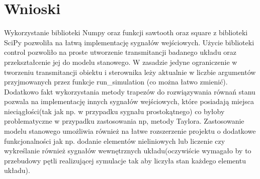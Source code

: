 \documentclass[12pt,a4paper]{article}
\begin{document}
\section{Wnioski}
Wykorzystanie biblioteki Numpy oraz funkcji sawtooth oraz square z biblioteki SciPy pozwoliła na łatwą implementację sygnałów wejściowych.
Użycie biblioteki control pozwoliło na proste utworzenie transmitancji badanego układu oraz przekształcenie jej do modelu stanowego. W zasadzie jedyne ograniczenie w tworzeniu transmitancji obiektu i sterownika leży aktualnie w liczbie argumentów przyjmowanych przez funkcje run\_simulation (co można łatwo zmienić).
Dodatkowo fakt wykorzystania metody trapezów do rozwiązywania równań stanu pozwala na implementację innych sygnałów wejściowych, które posiadają miejsca nieciągłości(tak jak np. w przypadku sygnału prostokątnego) co byłoby problematyczne w przypadku zastosowania np, metody Taylora.
Zastosowanie modelu stanowego umożliwia również na łatwe rozszerzenie projektu o dodatkowe funkcjonalności jak np. dodanie elementów nieliniowych lub liczenie czy wykreślanie również sygnałów wewnętrznych układu(oczywiście wymagało by to przebudowy pętli realizującej symulacje tak aby liczyła stan każdego elementu układu).   
\end{document}
